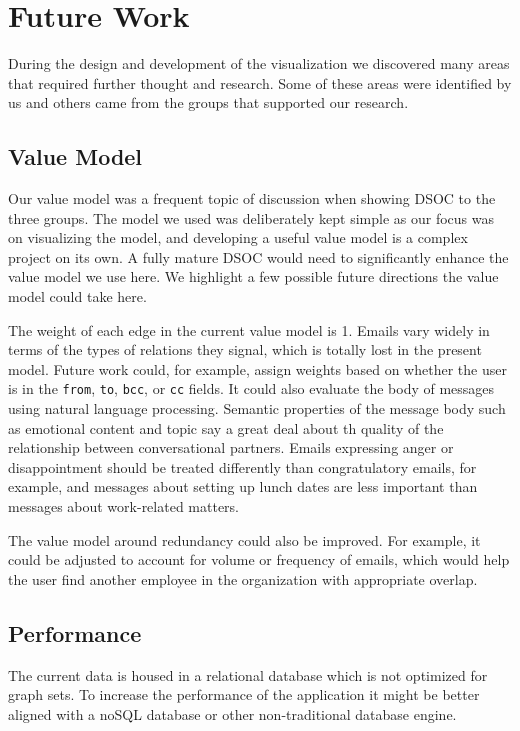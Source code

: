 \documentclass[journal]{vgtc}                %
\begin{document}
\section{Future Work}
\label{sec:future}
During the design and development of the visualization we discovered many areas that required further thought and research.  Some of these areas were identified by us and others came from the groups that supported our research.

\subsection{Value Model}
Our value model was a frequent topic of discussion when showing DSOC to the three groups. The model we used was deliberately kept simple as our focus was on visualizing the model, and developing a useful value model is a complex project on its own. A fully mature DSOC would need to significantly enhance the value model we use here. We highlight a few possible future directions the value model could take here. 

The weight of each edge in the current value model is 1. Emails vary widely in terms of the types of relations they signal, which is totally lost in the present model. Future work could, for example, assign weights based on whether the user is in the \texttt{from}, \texttt{to}, \texttt{bcc}, or \texttt{cc} fields.  It could also evaluate the body of messages using natural language processing. Semantic properties of the message body such as emotional content and topic say a great deal about th quality of the relationship between conversational partners. Emails expressing anger or disappointment should be treated differently than congratulatory emails, for example, and messages about setting up lunch dates are less important than messages about work-related matters. 

The value model around redundancy could also be improved. For example, it could be adjusted to account for volume or frequency of emails, which would help the user find another employee in the organization with appropriate overlap.

\subsection{Performance}

The current data is housed in a relational database which is not optimized for graph sets.  To increase the performance of the application it might be better aligned with a noSQL database or other non-traditional database engine.
\end{document}
